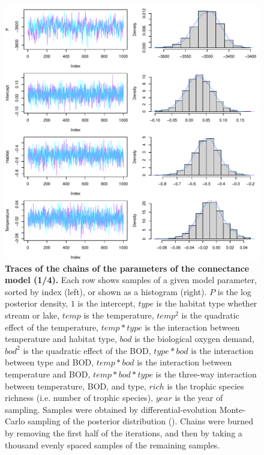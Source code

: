 \documentclass[11pt, oneside]{article}
\begin{document}
\begin{figure}[H]
\begin{center}
\includegraphics[page=1, width=1\linewidth]{b0_6_3/out_con/fig_tracePlot_beta.pdf}
\caption{
    \textbf{Traces of the chains of the parameters of the connectance model (1/4).}
    Each row shows samples of a given model parameter, sorted by index (left), or shown as a histogram (right).
    $P$ is the log posterior density, $1$ is the intercept, $type$ is the habitat type whether stream or lake, $temp$ is the temperature, $temp^2$ is the quadratic effect of the temperature, $temp * type$ is the interaction between temperature and habitat type, $bod$ is the biological oxygen demand, $bod^2$ is the quadratic effect of the BOD, $type * bod$ is the interaction between type and BOD, $temp * bod$ is the interaction between temperature and BOD, $temp * bod * type$ is the three-way interaction between temperature, BOD, and type, $rich$ is the trophic species richness (i.e. number of trophic species), $year$ is the year of sampling.
    Samples were obtained by differential-evolution Monte-Carlo sampling of the posterior distribution (\cite{TerBraak2006}).
    Chains were burned by removing the first half of the iterations, and then by taking a thousand evenly spaced samples of the remaining samples.
} 
\end{center}
\end{figure}
\end{document}
